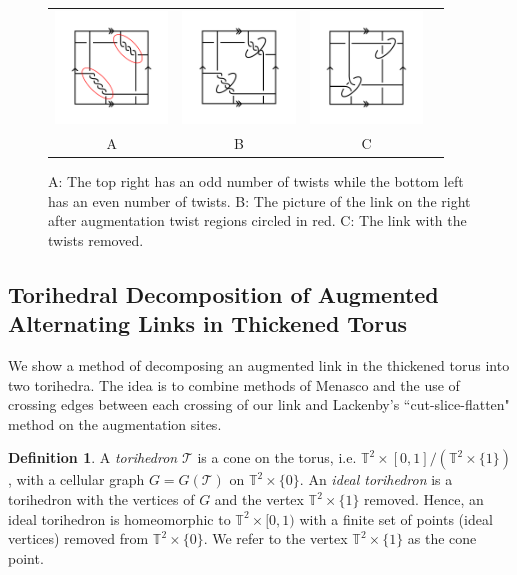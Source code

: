 \documentclass[11pt]{amsart}
\newcommand{\torus}{{\mathbb{T}^2}}
\newcommand{\sT}{{\mathcal{T}}}
\theoremstyle{plain}
\theoremstyle{definition}
\newtheorem{define}[theorem]{Definition}
\begin{document}
 \begin{figure}
 \centering
 \begin{tabular}{cccc}
 \includegraphics [width=3cm]{fig1}&
 \includegraphics  [width=3cm]{twist-augment}&
  \includegraphics [width=3cm]{fig-2}\\
  A&B&C
  \end{tabular}
 \caption{A: The top right has an odd number of twists while the bottom left has an even number of twists. B: The picture of the link on the right after augmentation twist regions circled in red. C: The link with the twists removed.}
 \label{fig:Augmentations}
 \end{figure}

\subsection{Torihedral Decomposition of Augmented Alternating Links in Thickened Torus}


We show a method of decomposing an augmented link in the thickened torus into
two torihedra. The idea is to combine methods of Menasco
\cite{Menasco} and the use of crossing edges between each crossing of our link
and Lackenby's ``cut-slice-flatten" method \cite{lackenby} on the augmentation
sites.   


\begin{define}\cite{CKP2}
\label{def:torihedron}
A \emph{torihedron} $\sT$ is a cone on the torus, 
i.e. $\torus \times [0,1]/(\torus \times \{1\})$, with a cellular graph
$G = G(\sT)$ on $\torus \times \{0\}$.
An \emph{ideal torihedron} is a torihedron with the
vertices of $G$ and the vertex $\torus \times \{1\}$ removed. Hence, an ideal
torihedron is homeomorphic to $\torus \times [0,1)$ with a finite set of points
(ideal vertices) removed from $\torus \times \{0\}$.
We refer to the vertex $\torus \times \{1\}$ as the cone point.
\end{define}
\end{document}
